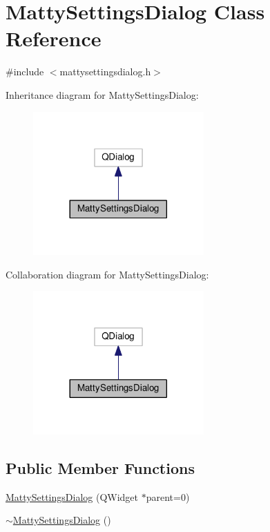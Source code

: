 \hypertarget{class_matty_settings_dialog}{}\section{Matty\+Settings\+Dialog Class Reference}
\label{class_matty_settings_dialog}


{\ttfamily \#include $<$mattysettingsdialog.\+h$>$}



Inheritance diagram for Matty\+Settings\+Dialog\+:
\nopagebreak
\begin{figure}[H]
\begin{center}
\leavevmode
\includegraphics[width=185pt]{class_matty_settings_dialog__inherit__graph}
\end{center}
\end{figure}


Collaboration diagram for Matty\+Settings\+Dialog\+:
\nopagebreak
\begin{figure}[H]
\begin{center}
\leavevmode
\includegraphics[width=185pt]{class_matty_settings_dialog__coll__graph}
\end{center}
\end{figure}
\subsection*{Public Member Functions}
\begin{DoxyCompactItemize}
\item 
\hyperlink{class_matty_settings_dialog_a609bf8d82968105e72cf497216230451}{Matty\+Settings\+Dialog} (Q\+Widget $\ast$parent=0)
\item 
\hyperlink{class_matty_settings_dialog_ae04421f7937d00dc4e05856d78e10d9a}{$\sim$\+Matty\+Settings\+Dialog} ()
\end{DoxyCompactItemize}
